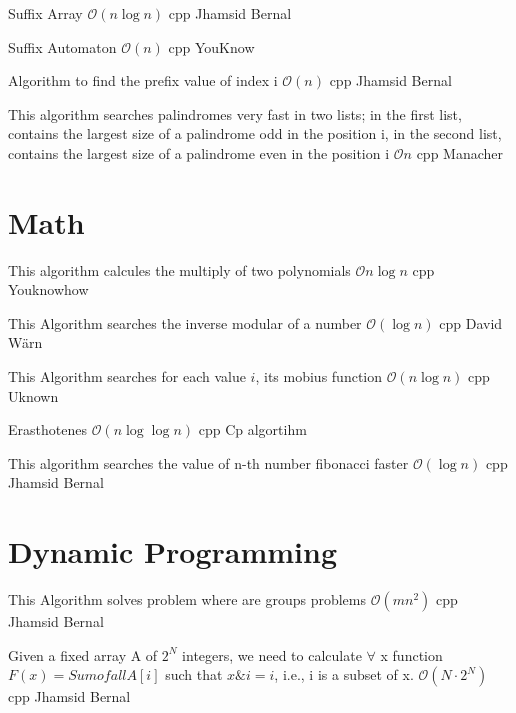 {Suffix Array}
{$\mathcal{O}(n \log{n})$}
{cpp}{}
{Jhamsid Bernal}
\progress

{Suffix Automaton}
{$\mathcal{O}(n)$}
{cpp}{}
{YouKnow}
\progress

{Algorithm to find the prefix value of index i}
{$\mathcal{O}(n)$}
{cpp}{}
{Jhamsid Bernal}
\progress

{This algorithm searches palindromes very fast in two lists; in the first list, contains the largest size of a palindrome odd in the position i, in the second list, contains the largest size of a palindrome even in the position i}
{$\mathcal{O}{n}$}
{cpp}{}
{Manacher}

\section{Math}

{This algorithm calcules the multiply of two polynomials}
{$\mathcal{O}{n \log{n}}$}
{cpp}{}
{Youknowhow}

{This Algorithm searches the inverse modular of a number}
{$\mathcal{O}(\log{n})$}
{cpp}{}
{David Wärn}

{This Algorithm searches for each value $i$, its mobius function}
{$\mathcal{O}(n\log{n})$}
{cpp}{}
{Uknown}

{Erasthotenes}
{$\mathcal{O}(n \log{ \log{n}})$}
{cpp}{}
{Cp algortihm}

{This algorithm searches the value of n-th number fibonacci faster}
{$\mathcal{O}(\log{n})$}
{cpp}{}
{Jhamsid Bernal}

\section{Dynamic Programming}

{This Algorithm solves problem where are groups problems}
{$\mathcal{O}(mn^2)$}
{cpp}{}
{Jhamsid Bernal}
\progress

{Given a fixed array A of $2^N$ integers, we need to calculate $\forall$
x function $F(x) = Sum of all A[i]$ such that $x\&i = i$, i.e., i is a subset 
of x.}
{$\mathcal{O}(N \cdot 2^N)$}
{cpp}{}
{Jhamsid Bernal}

